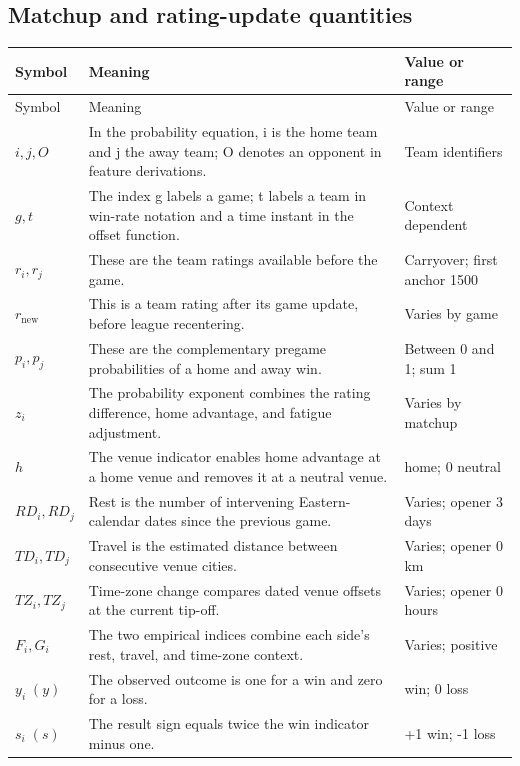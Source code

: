 \documentclass[11pt]{article}
\begin{document}
\subsection*{Matchup and rating-update quantities}
\begin{longtable}{@{}>{\raggedright\arraybackslash}p{}>{\raggedright\arraybackslash}p{}>{\raggedright\arraybackslash}p{}@{}}
\toprule
Symbol & Meaning & Value or range\\
\midrule
\endfirsthead
\toprule
Symbol & Meaning & Value or range\\
\midrule
\endhead
\bottomrule
\endfoot
$i,j,O$ & In the probability equation, i is the home team and j the away team; O denotes an opponent in feature derivations. & Team identifiers\\
$g,t$ & The index g labels a game; t labels a team in win-rate notation and a time instant in the offset function. & Context dependent\\
$r_i,r_j$ & These are the team ratings available before the game. & Carryover; first anchor 1500\\
$r_{\mathrm{new}}$ & This is a team rating after its game update, before league recentering. & Varies by game\\
$p_i,p_j$ & These are the complementary pregame probabilities of a home and away win. & Between 0 and 1; sum 1\\
$z_i$ & The probability exponent combines the rating difference, home advantage, and fatigue adjustment. & Varies by matchup\\
$h$ & The venue indicator enables home advantage at a home venue and removes it at a neutral venue. & 1 home; 0 neutral\\
$RD_i,RD_j$ & Rest is the number of intervening Eastern-calendar dates since the previous game. & Varies; opener 3 days\\
$TD_i,TD_j$ & Travel is the estimated distance between consecutive venue cities. & Varies; opener 0 km\\
$TZ_i,TZ_j$ & Time-zone change compares dated venue offsets at the current tip-off. & Varies; opener 0 hours\\
$F_i,G_i$ & The two empirical indices combine each side's rest, travel, and time-zone context. & Varies; positive\\
$y_i\;(y)$ & The observed outcome is one for a win and zero for a loss. & 1 win; 0 loss\\
$s_i\;(s)$ & The result sign equals twice the win indicator minus one. & +1 win; -1 loss\\

\end{longtable}
\end{document}
